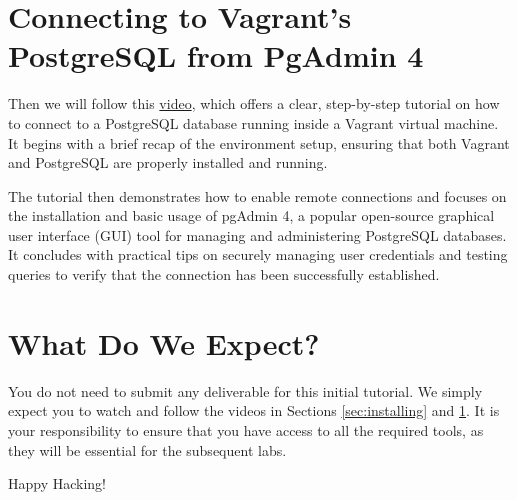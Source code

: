 \documentclass{article}
\begin{document}
\section{Connecting to Vagrant's PostgreSQL from PgAdmin 4} \label{sec:connecting}
Then we will follow this \href{https://youtu.be/_9rVc18NuOI?si=cQ2p9BFS2gfkHZtJ}{video}, which offers a clear, step-by-step tutorial on how to connect to a PostgreSQL database running inside a Vagrant virtual machine. It begins with a brief recap of the environment setup, ensuring that both Vagrant and PostgreSQL are properly installed and running.

The tutorial then demonstrates how to enable remote connections and focuses on the installation and basic usage of pgAdmin 4, a popular open-source graphical user interface (GUI) tool for managing and administering PostgreSQL databases. It concludes with practical tips on securely managing user credentials and testing queries to verify that the connection has been successfully established.

\section{What Do We Expect?}
You do not need to submit any deliverable for this initial tutorial. We simply expect you to watch and follow the videos in Sections \ref{sec:installing} and \ref{sec:connecting}. It is your responsibility to ensure that you have access to all the required tools, as they will be essential for the subsequent labs.

\vspace{5mm}
Happy Hacking! 
\end{document}
